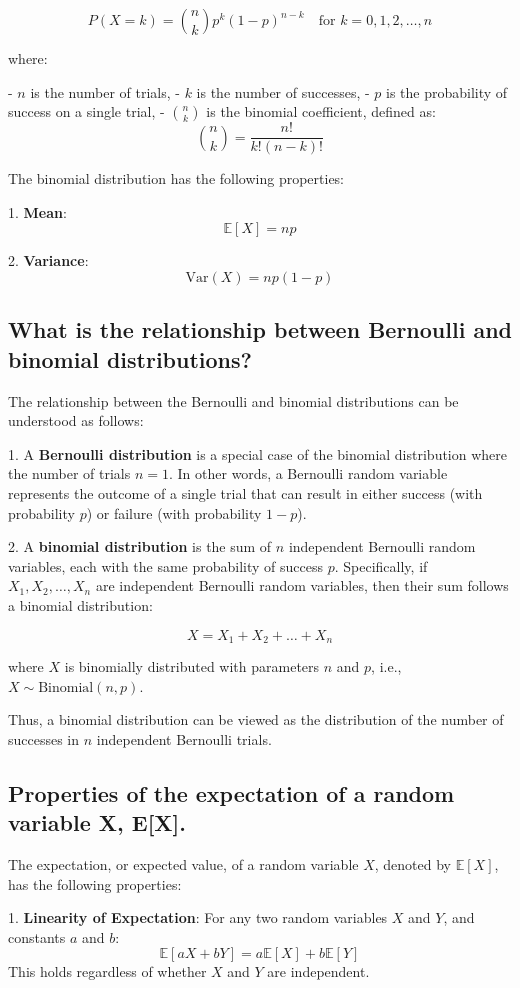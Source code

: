 \[
P(X = k) = \binom{n}{k} p^k (1 - p)^{n - k} \quad \text{for } k = 0, 1, 2, \dots, n
\]

where:

- $n$ is the number of trials,
- $k$ is the number of successes,
- $p$ is the probability of success on a single trial,
- $\binom{n}{k}$ is the binomial coefficient, defined as:
  \[
  \binom{n}{k} = \frac{n!}{k!(n - k)!}
  \]

The binomial distribution has the following properties:

1. \textbf{Mean}: 
   \[
   \mathbb{E}[X] = np
   \]

2. \textbf{Variance}:
   \[
   \text{Var}(X) = np(1 - p)
   \]


\subsection{What is the relationship between Bernoulli and binomial distributions?}
The relationship between the Bernoulli and binomial distributions can be understood as follows:

1. A \textbf{Bernoulli distribution} is a special case of the binomial distribution where the number of trials $n = 1$. In other words, a Bernoulli random variable represents the outcome of a single trial that can result in either success (with probability $p$) or failure (with probability $1 - p$).

2. A \textbf{binomial distribution} is the sum of $n$ independent Bernoulli random variables, each with the same probability of success $p$. Specifically, if $X_1, X_2, \dots, X_n$ are independent Bernoulli random variables, then their sum follows a binomial distribution:

\[
X = X_1 + X_2 + \dots + X_n
\]

where $X$ is binomially distributed with parameters $n$ and $p$, i.e., $X \sim \text{Binomial}(n, p)$.

Thus, a binomial distribution can be viewed as the distribution of the number of successes in $n$ independent Bernoulli trials.


\subsection{Properties of the expectation of a random variable X, E[X].}
The expectation, or expected value, of a random variable $X$, denoted by $\mathbb{E}[X]$, has the following properties:

1. \textbf{Linearity of Expectation}:
   For any two random variables $X$ and $Y$, and constants $a$ and $b$:
   \[
   \mathbb{E}[aX + bY] = a\mathbb{E}[X] + b\mathbb{E}[Y]
   \]
   This holds regardless of whether $X$ and $Y$ are independent.

